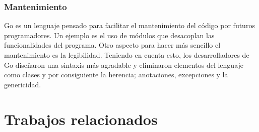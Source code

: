 \subsubsection{Mantenimiento}
Go es un lenguaje pensado para facilitar el mantenimiento del código por futuros programadores. Un ejemplo es el uso de módulos que desacoplan las funcionalidades del programa. Otro aspecto para hacer más sencillo el mantenimiento es la legibilidad. Teniendo en cuenta esto, los desarrolladores de Go diseñaron una sintaxis más agradable y eliminaron elementos del lenguaje como clases y por consiguiente la herencia; anotaciones, excepciones y la genericidad.

\section{Trabajos relacionados}





